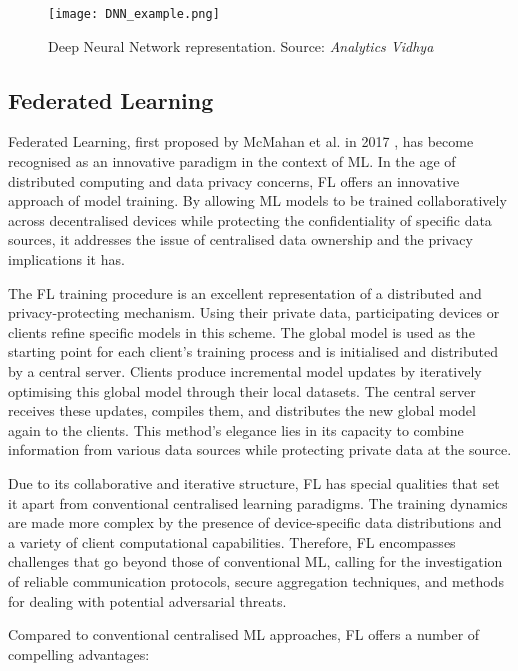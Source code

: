 \begin{figure}[h!]
        \centering %
        \texttt{[image: DNN\_example.png]}
        \caption{Deep Neural Network representation. Source: \textit{Analytics Vidhya}} %
        \label{fig:DNN_example}
\end{figure}


\subsection{Federated Learning}
Federated Learning, first proposed by McMahan et al. in 2017 \cite{FederatedLearningPaper}, has become recognised as an innovative paradigm in the context of ML. In the age of distributed computing and data privacy concerns, FL offers an innovative approach of model training. By allowing ML models to be trained collaboratively across decentralised devices while protecting the confidentiality of specific data sources, it addresses the issue of centralised data ownership and the privacy implications it has.

The FL training procedure is an excellent representation of a distributed and privacy-protecting mechanism. Using their private data, participating devices or clients refine specific models in this scheme. The global model is used as the starting point for each client's training process and is initialised and distributed by a central server. Clients produce incremental model updates by iteratively optimising this global model through their local datasets. The central server receives these updates, compiles them, and distributes the new global model again to the clients. This method's elegance lies in its capacity to combine information from various data sources while protecting private data at the source.

Due to its collaborative and iterative structure, FL has special qualities that set it apart from conventional centralised learning paradigms. The training dynamics are made more complex by the presence of device-specific data distributions and a variety of client computational capabilities. Therefore, FL encompasses challenges that go beyond those of conventional ML, calling for the investigation of reliable communication protocols, secure aggregation techniques, and methods for dealing with potential adversarial threats.

Compared to conventional centralised ML approaches, FL offers a number of compelling advantages:

